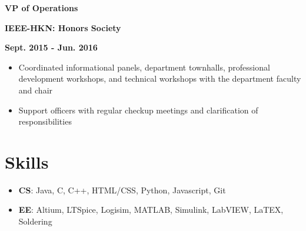 \documentclass[12pt]{article}
\newcommand\textbox[1]{\parbox{.333\textwidth}{#1}}
\newcommand{\textlcr}[3]{\textbox{\textbf{#1}\hfill}\textbox{\hfil \textbf{#2}\hfil}\textbox{\hfill \textbf{#3}}}
\begin{document}
\textlcr{VP of Operations}{IEEE-HKN: Honors Society}{Sept. 2015 - Jun. 2016}
\begin{itemize}
\item Coordinated informational panels, department townhalls, professional development workshops, and technical workshops with the department faculty and chair
\item Support officers with regular checkup meetings and clarification of responsibilities
\end{itemize}

\section*{Skills}
\vspace*{-1em}\makebox[\linewidth]{\rule{\textwidth}{0.4pt}}
\begin{itemize}
\item \textbf{CS}: Java, C, C++, HTML/CSS, Python, Javascript, Git
\item \textbf{EE}: Altium, LTSpice, Logisim, MATLAB, Simulink, LabVIEW, LaTEX, Soldering
\end{itemize}
\end{document}

